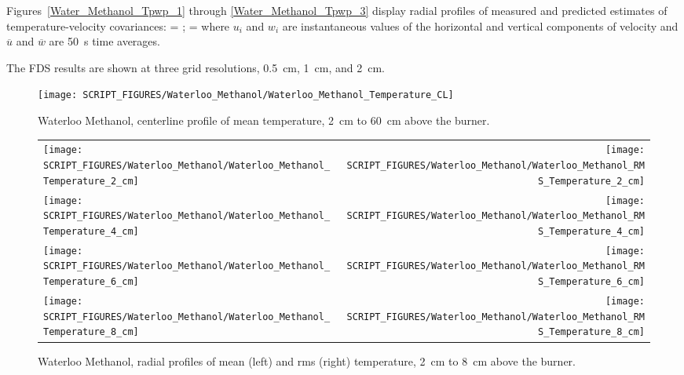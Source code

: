 Figures~\ref{Water_Methanol_Tpwp_1} through \ref{Water_Methanol_Tpwp_3} display radial profiles of measured and predicted estimates of temperature-velocity covariances:
\be
    =   \quad ; \quad {} = 
\ee
where $u_i$ and $w_i$ are instantaneous values of the horizontal and vertical components of velocity and $\overline{u}$ and $\overline{w}$ are 50~s time averages.

The FDS results are shown at three grid resolutions, 0.5~cm, 1~cm, and 2~cm.

\begin{figure}[!ht]
\centering
\texttt{[image: SCRIPT\_FIGURES/Waterloo\_Methanol/Waterloo\_Methanol\_Temperature\_CL]}
\caption[Waterloo Methanol, centerline profile, mean temperature, 2~cm to 60~cm above burner]
{Waterloo Methanol, centerline profile of mean temperature, 2~cm to 60~cm above the burner.}
\label{Water_Methanol_Plume_Temp_CL}
\end{figure}

\begin{figure}[p]
\begin{tabular*}{\textwidth}{l@{\extracolsep{\fill}}r}
\texttt{[image: SCRIPT\_FIGURES/Waterloo\_Methanol/Waterloo\_Methanol\_Temperature\_2\_cm]} &
\texttt{[image: SCRIPT\_FIGURES/Waterloo\_Methanol/Waterloo\_Methanol\_RMS\_Temperature\_2\_cm]} \\
\texttt{[image: SCRIPT\_FIGURES/Waterloo\_Methanol/Waterloo\_Methanol\_Temperature\_4\_cm]} &
\texttt{[image: SCRIPT\_FIGURES/Waterloo\_Methanol/Waterloo\_Methanol\_RMS\_Temperature\_4\_cm]} \\
\texttt{[image: SCRIPT\_FIGURES/Waterloo\_Methanol/Waterloo\_Methanol\_Temperature\_6\_cm]} &
\texttt{[image: SCRIPT\_FIGURES/Waterloo\_Methanol/Waterloo\_Methanol\_RMS\_Temperature\_6\_cm]} \\
\texttt{[image: SCRIPT\_FIGURES/Waterloo\_Methanol/Waterloo\_Methanol\_Temperature\_8\_cm]} &
\texttt{[image: SCRIPT\_FIGURES/Waterloo\_Methanol/Waterloo\_Methanol\_RMS\_Temperature\_8\_cm]}
\end{tabular*}
\caption[Waterloo Methanol, radial mean and rms temperature, 2~cm to 8~cm above burner]
{Waterloo Methanol, radial profiles of mean (left) and rms (right) temperature, 2~cm to 8~cm above the burner.}
\label{Water_Methanol_Plume_Temp_1}
\end{figure}


